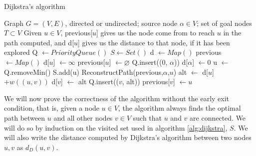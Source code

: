 \documentclass[a4paper,10pt]{report}
\begin{document}
\begin{algorithm}
\caption{Dijkstra's algorithm}
\label{alg:dijkstra}
\begin{algorithmic}[1]
\Require Graph $G = (V, E)$, directed or undirected; source node $\alpha \in V$; set of goal nodes $T \subset V$
\Ensure Given $u \in V$, previous[$u$] gives us the node come from to reach $u$ in the path computed, and d[$u$] gives us the distance to that node, if it has been explored
\State Q $\gets PriorityQueue()$
\State $S \gets Set()$
\State d $\gets Map()$ 
\State previous $\gets Map()$
	\State d[$u$] $\gets \infty$
	\State previous[$u$] $\gets \varnothing$
\EndFor
\State Q.insert((0, $\alpha$))
\State d[$\alpha$] $\gets 0$
	\State u $\gets$ Q.removeMin()
	\State S.add(u)
	 
		\State \Return ReconstructPath(previous,$\alpha$,$u$)
	\EndIf
			\Continue {}
		\EndIf
		\State alt $\gets$ d[$u$] $+ w((u, v))$
			\State d[$v$] $\gets$ alt
			\State Q.insert(($v$, alt))
			\State previous[$v$] $\gets u$
		\EndIf
	\EndFor
\EndWhile
\EndProcedure
\end{algorithmic}
\end{algorithm}

We will now prove the correctness of the algorithm without the early exit condition, that is, given a node $u \in V$, the algorithm always finds the optimal path between $u$ and all other nodes $v \in V$ such that $u$ and $v$ are connected. We will do so by induction on the visited set used in algorithm \ref{alg:dijkstra}, $S$. We will also write the distance computed by Dijkstra's algorithm between two nodes $u, v$ as $d_D(u, v)$.
\end{document}

